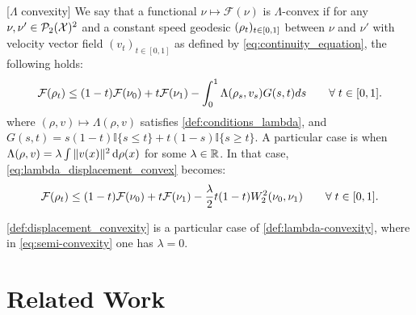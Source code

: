 \begin{definition}\label{def:lambda-convexity}[$\Lambda$ convexity]
	We say that a functional $\nu\mapsto\mathcal{F}(\nu)$ is $\Lambda$-convex
	if for any $\nu,\nu'\in \mathcal{P}_2({{\mathcal X}})^2$ and a constant speed geodesic $(\text{\ensuremath{\rho_{t}}})_{t \in [0,1]}$
	between $\nu$ and $\nu'$ with velocity vector field $(v_{t})_{t \in [0,1]}$ as defined by \cref{eq:continuity_equation},
	the following holds:
	\begin{equation}\label{eq:lambda_displacement_convex}
		{{\mathcal F}}(\rho_{t})\leq(1-t){{\mathcal F}}(\nu_{0})+t{{\mathcal F}}(\nu_{1})-\int_{0}^{1}\Lambda(\rho_{s},v_{s})G(s,t)ds \qquad\forall\; t\in[0,1].
	\end{equation}
	where $(\rho,v)\mapsto\Lambda(\rho,v)$ satisfies \cref{def:conditions_lambda},
	and $G(s,t)=s(1-t) \mathbb{I}\{s\leq t\}
	+t(1-s) \mathbb{I}\{s\geq t\}$.
	A particular case is when $\Lambda(\rho,v)= \lambda \int \Vert v(x) \Vert^2 \mathop{}\!\mathrm{d} \rho(x)   $ for some $\lambda\in {{\mathbb R}}$. In that case, \cref{eq:lambda_displacement_convex} becomes:
\begin{align}\label{eq:semi-convexity}
	{{\mathcal F}}(\rho_{t})\leq(1-t){{\mathcal F}}(\nu_{0})+t{{\mathcal F}}(\nu_{1})-\frac{\lambda}{2}t(1-t)W_2^2(\nu_0,\nu_1)  \qquad\forall\; t\in[0,1].
\end{align}
\end{definition}
\cref{def:displacement_convexity} is a particular case of \cref{def:lambda-convexity}, where in \cref{eq:semi-convexity} one has $\lambda =0$.

\section{Related Work}\label{sec:related_work}
